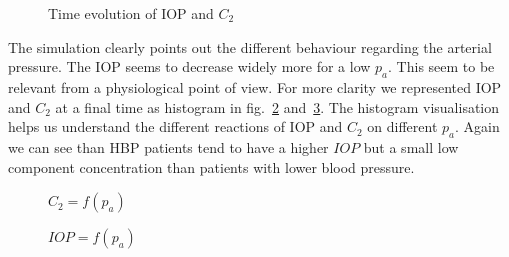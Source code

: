 \begin{figure}[htbp]
 \centering
 
  \caption[text1]{Time evolution of IOP and $C_2$ }
    \label{fig:tevolpc2}
\end{figure}
The simulation clearly points out the different behaviour regarding the arterial pressure. The IOP seems to decrease widely more for a low $p_a$. This seem to be relevant from a physiological point of view. For more clarity we represented IOP and $C_2$ at a final time as histogram in fig.~\ref{fig:histc2} and~\ref{fig:histIOP}. The histogram visualisation helps us understand the different reactions of IOP and $C_2$ on different $p_a$. Again we can see than HBP patients tend to have a higher $IOP$ but a small low component concentration than patients with lower blood pressure.
\begin{figure}[h]

  \caption{$C_2 = f(p_a)$}
  \label{fig:histc2}
\end{figure}
\begin{figure}[h]

  \caption{$IOP = f(p_a)$}
  \label{fig:histIOP}
\end{figure}

